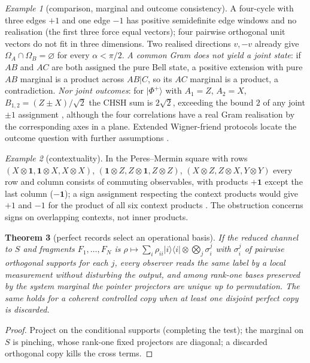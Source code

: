 \documentclass[aps,pra,onecolumn,superscriptaddress,nofootinbib,10pt]{revtex4-2}
\newtheorem{theorem}{Theorem}
\theoremstyle{definition}
\theoremstyle{remark}
\newtheorem{example}[theorem]{Example}
\begin{document}
\begin{example}[comparison, marginal and outcome consistency]\label{ex:fmoutcomes}
A four-cycle with three edges $+1$ and one edge $-1$ has positive semidefinite edge windows and no realisation
(the first three force equal vectors); four pairwise orthogonal unit vectors do not fit in three dimensions.  Two realised
directions $v,-v$ already give $\Omega_A\cap\Omega_B=\varnothing$ for every $\alpha<\pi/2$.  \emph{A common Gram does not yield a joint state}: if $AB$
and $AC$ are both assigned the pure Bell state, a positive extension with pure $AB$ marginal is a product
across $AB|C$, so its $AC$ marginal is a product, a contradiction.  \emph{Nor joint outcomes}: for $\lvert\Phi^+\rangle$ with
$A_1=Z$, $A_2=X$, $B_{1,2}=(Z\pm X)/\sqrt2$ the CHSH sum is $2\sqrt2$, exceeding the bound $2$ of any joint $\pm1$ assignment
\cite{n2-chsh}, although the four correlations have a real Gram realisation by the corresponding
axes in a plane.  Extended Wigner-friend protocols locate the outcome question with further assumptions
\cite{n2-brukner,n3:Bong}.
\end{example}

\begin{example}[contextuality]\label{ex:fmcontext}
In the Peres--Mermin square with rows $(X\otimes\mathbf1,\mathbf1\otimes X,X\otimes X)$, $(\mathbf1\otimes Z,Z\otimes\mathbf1,Z\otimes Z)$, $(X\otimes Z,Z\otimes X,Y\otimes Y)$ every row and
column consists of commuting observables, with products $+\mathbf1$ except the last column ($-\mathbf1$); a sign assignment
respecting the context products would give $+1$ and $-1$ for the product of all six context products
\cite{n2-peres,n2-mermin}.  The obstruction concerns signs on overlapping contexts, not inner products.
\end{example}

\begin{theorem}[perfect records select an operational basis]\label{thm:fmpointer}
If the reduced channel to $S$ and fragments $F_1,\dots,F_N$ is $\rho\mapsto\sum_i\rho_{ii}\lvert i\rangle\langle i\rvert\otimes\bigotimes_j\sigma_i^j$ with $\sigma_i^j$ of pairwise
orthogonal supports for each $j$, every observer reads the same label by a local measurement without
disturbing the output, and among rank-one bases preserved by the system marginal the pointer projectors
are unique up to permutation.  The same holds for a coherent controlled copy when at least one disjoint
perfect copy is discarded.
\end{theorem}
\begin{proof}
Project on the conditional supports (completing the test); the marginal on $S$ is pinching, whose rank-one
fixed projectors are diagonal; a discarded orthogonal copy kills the cross terms.
\end{proof}
\end{document}
